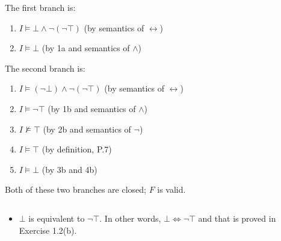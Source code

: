 \begin{exer}[1.2]
\begin{enumerate}[label=(\alph*)]
            The first branch is:
            \begin{enumerate}[label=\arabic*a.]
                \item %
                    $I \models \bot \land \neg (\neg \top)$ (by semantics of $\leftrightarrow$)
                \item %
                    $I \models \bot$ (by 1a and semantics of $\land$)
            \end{enumerate}

            The second branch is:
            \begin{enumerate}[label=\arabic*b.]
                \item %
                    $I \models (\neg \bot) \land \neg (\neg \top)$ (by semantics of $\leftrightarrow$)
                \item %
                    $I \models \neg\top$ (by 1b and semantics of $\land$)
                \item %
                    $I \not\models \top$ (by 2b and semantics of $\neg$)
                \item %
                    $I \models \top$ (by definition, P.7)
                \item %
                    $I \models \bot$ (by 3b and 4b)
            \end{enumerate}
            Both of these two branches are closed; $F$ is valid.
    \end{enumerate}
\end{exer}

\begin{exer}[1.3]
    $ $
    \begin{itemize}
        \item
            $\bot$ is equivalent to $\neg \top$.
            In other words, $\bot \Leftrightarrow \neg \top$ and that is proved in Exercise 1.2(b).
    \end{itemize}
\end{exer}

